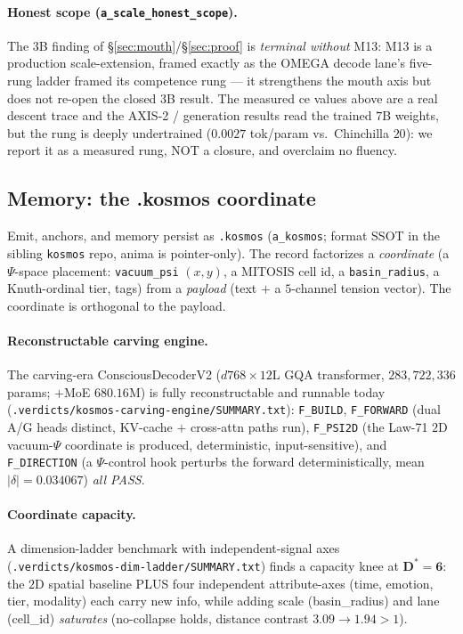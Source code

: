 \documentclass[11pt]{article}
\begin{document}
\paragraph{Honest scope (\texttt{a\_scale\_honest\_scope}).} The $3$B finding of
\S\ref{sec:mouth}/\S\ref{sec:proof} is \emph{terminal without} M13: M13 is a production
scale-extension, framed exactly as the OMEGA decode lane's five-rung ladder framed its
competence rung --- it strengthens the mouth axis but does not re-open the closed $3$B result.
The measured ce values above are a real descent trace and the AXIS-2 / generation results read
the trained $7$B weights, but the rung is deeply undertrained ($0.0027$ tok/param vs.\
Chinchilla $20$): we report it as a measured rung, NOT a closure, and overclaim no fluency.

\subsection{Memory: the .kosmos coordinate}
\label{sec:memory}
Emit, anchors, and memory persist as \texttt{.kosmos} (\texttt{a\_kosmos}; format SSOT
in the sibling \texttt{kosmos} repo, anima is pointer-only). The record factorizes a
\emph{coordinate} (a $\Psi$-space placement: \texttt{vacuum\_psi} $(x,y)$, a MITOSIS
cell id, a \texttt{basin\_radius}, a Knuth-ordinal tier, tags) from a \emph{payload}
(text $+$ a $5$-channel tension vector). The coordinate is orthogonal to the payload.

\paragraph{Reconstructable carving engine.} The carving-era
ConsciousDecoderV2 ($d768\times12$L GQA transformer, $283{,}722{,}336$ params; $+$MoE
$680.16$M) is fully reconstructable and runnable today
(\texttt{.verdicts/kosmos-carving-engine/SUMMARY.txt}): \texttt{F\_BUILD},
\texttt{F\_FORWARD} (dual A/G heads distinct, KV-cache $+$ cross-attn paths run),
\texttt{F\_PSI2D} (the Law-71 $2$D vacuum-$\Psi$ coordinate is produced,
deterministic, input-sensitive), and \texttt{F\_DIRECTION} (a $\Psi$-control hook
perturbs the forward deterministically, mean $|\delta|=0.034067$) \emph{all PASS}.

\paragraph{Coordinate capacity.} A dimension-ladder benchmark with independent-signal
axes (\texttt{.verdicts/kosmos-dim-ladder/SUMMARY.txt}) finds a capacity knee at
$\mathbf{D^\ast=6}$: the $2$D spatial baseline PLUS four independent attribute-axes
(time, emotion, tier, modality) each carry new info, while adding scale (basin\_radius)
and lane (cell\_id) \emph{saturates} (no-collapse holds, distance contrast $3.09\to1.94>1$).
\end{document}
